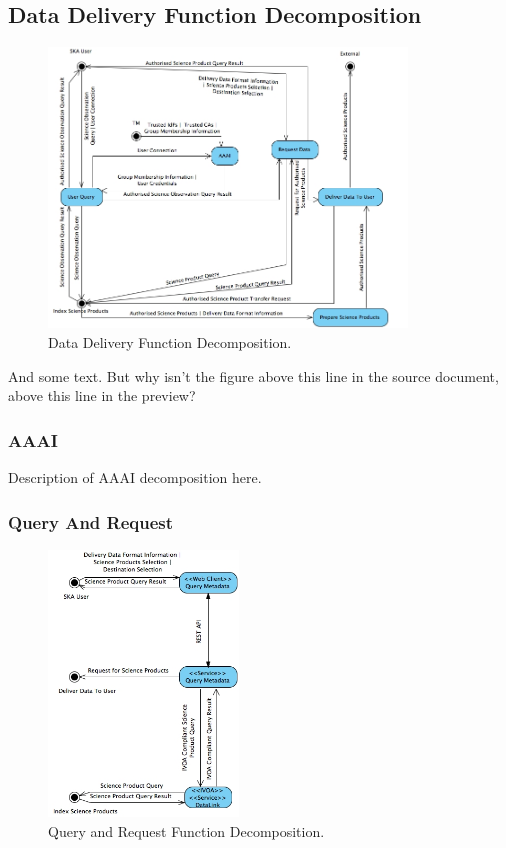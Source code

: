 \documentclass[11pt,a4paper]{article}
\begin{document}
\subsection{Data Delivery Function Decomposition}

\begin{figure}[h]
  \centering
  \includegraphics[width=0.85\textwidth]{L1.jpg}
  \caption{Data Delivery Function Decomposition.}
\end{figure}

And some text. But why isn't the figure above this line in the source document, above this line in the preview?


\subsubsection{AAAI}

Description of AAAI decomposition here.

\subsubsection{Query And Request}

\begin{figure}[h]
  \centering
  \includegraphics[width=0.45\textwidth]{l2.jpg}
  \caption{Query and Request Function Decomposition.}
\end{figure}
\end{document}
